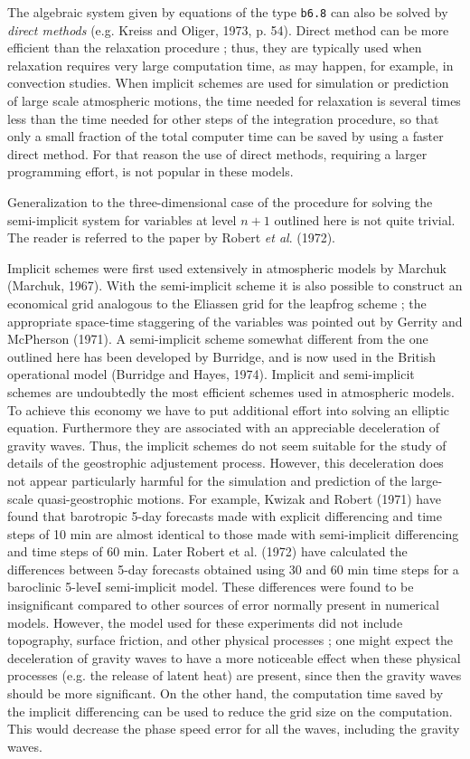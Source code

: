 The algebraic system given by equations of the type \texttt{b6.8} can
also be solved by \emph{direct methods} (e.g. Kreiss and Oliger, 1973,
p. 54). Direct method can be more efficient than the relaxation
procedure ; thus, they are typically used when relaxation requires very
large computation time, as may happen, for example, in convection
studies. When implicit schemes are used for simulation or prediction of
large scale atmospheric motions, the time needed for relaxation is
several times less than the time needed for other steps of the
integration procedure, so that only a small fraction of the total
computer time can be saved by using a faster direct method. For that
reason the use of direct methods, requiring a larger programming effort,
is not popular in these models.

Generalization to the three-dimensional case of the procedure for
solving the semi-implicit system for variables at level \(n + 1\)
outlined here is not quite trivial. The reader is referred to the paper
by Robert \emph{et al}. (1972).

Implicit schemes were first used extensively in atmospheric models by
Marchuk (Marchuk, 1967). With the semi-implicit scheme it is also
possible to construct an economical grid analogous to the Eliassen grid
for the leapfrog scheme ; the appropriate space-time staggering of the
variables was pointed out by Gerrity and McPherson (1971). A
semi-implicit scheme somewhat different from the one outlined here has
been developed by Burridge, and is now used in the British operational
model (Burridge and Hayes, 1974). Implicit and semi-implicit schemes are
undoubtedly the most efficient schemes used in atmospheric models. To
achieve this economy we have to put additional effort into solving an
elliptic equation. Furthermore they are associated with an appreciable
deceleration of gravity waves. Thus, the implicit schemes do not seem
suitable for the study of details of the geostrophic adjustement
process. However, this deceleration does not appear particularly
harmful for the simulation and prediction of the large-scale
quasi-geostrophic motions. For example, Kwizak and Robert (1971) have
found that barotropic 5-day forecasts made with explicit differencing
and time steps of 10 min are almost identical to those made with
semi-implicit differencing and time steps of 60 min. Later Robert et al.
(1972) have calculated the differences between 5-day forecasts obtained
using 30 and 60 min time steps for a baroclinic 5-leveI semi-implicit
model. These differences were found to be insignificant compared to
other sources of error normally present in numerical models. However,
the model used for these experiments did not include topography, surface
friction, and other physical processes ; one might expect the
deceleration of gravity waves to have a more noticeable effect when
these physical processes (e.g. the release of latent heat) are present,
since then the gravity waves should be more significant. On the other
hand, the computation time saved by the implicit differencing can be
used to reduce the grid size on the computation. This would decrease the
phase speed error for all the waves, including the gravity waves.

